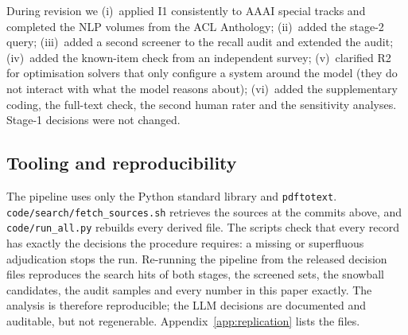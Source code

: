 During revision we (i)~applied I1 consistently to AAAI special tracks and completed the NLP volumes from the ACL Anthology; (ii)~added the stage-2 query; (iii)~added a second screener to the recall audit and extended the audit; (iv)~added the known-item check from an independent survey; (v)~clarified R2 for optimisation solvers that only configure a system around the model (they do not interact with what the model reasons about); (vi)~added the supplementary coding, the full-text check, the second human rater and the sensitivity analyses. Stage-1 decisions were not changed.

\subsection{Tooling and reproducibility}
The pipeline uses only the Python standard library and \texttt{pdftotext}. \texttt{code/search/fetch\_sources.sh} retrieves the sources at the commits above, and \texttt{code/run\_all.py} rebuilds every derived file. The scripts check that every record has exactly the decisions the procedure requires: a missing or superfluous adjudication stops the run. Re-running the pipeline from the released decision files reproduces the search hits of both stages, the screened sets, the snowball candidates, the audit samples and every number in this paper exactly. The analysis is therefore reproducible; the LLM decisions are documented and auditable, but not regenerable. Appendix~\ref{app:replication} lists the files.
